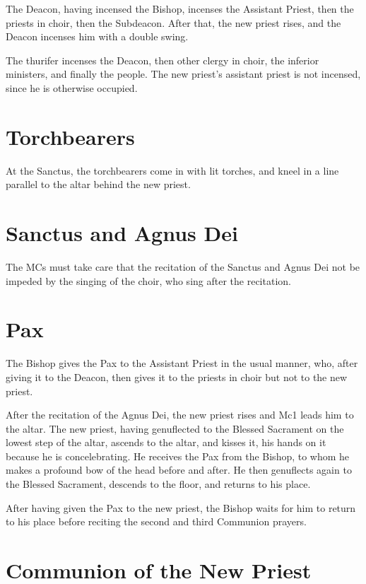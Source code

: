 \documentclass{report}
\begin{document}
{	The Deacon, having incensed the Bishop, incenses the Assistant Priest, then
	the priests in choir, then the Subdeacon. After that, the new priest rises,
	and the Deacon incenses him with a double swing.

	The thurifer incenses the Deacon, then other clergy in choir, the inferior
	ministers, and finally the people. The new priest’s assistant priest is not
	incensed, since he is otherwise occupied.

	\section{Torchbearers}

	At the Sanctus, the torchbearers come in with lit torches, and kneel in a
	line parallel to the altar behind the new priest.

	\section{Sanctus and Agnus Dei}

	The MCs must take care that the recitation of the Sanctus and Agnus Dei not
	be impeded by the singing of the choir, who sing after the recitation.

	\section{Pax}

	The Bishop gives the Pax to the Assistant Priest in the usual manner, who,
	after giving it to the Deacon, then gives it to the priests in choir but
	not to the new priest.

	After the recitation of the Agnus Dei, the new priest rises and Mc1 leads
	him to the altar. The new priest, having genuflected to the Blessed
	Sacrament on the lowest step of the altar, ascends to the altar, and kisses
	it, his hands on it because he is concelebrating. He receives the Pax from
	the Bishop, to whom he makes a profound bow of the head before and after.
	He then genuflects again to the Blessed Sacrament, descends to the floor,
	and returns to his place.

	After having given the Pax to the new priest, the Bishop waits for him to
	return to his place before reciting the second and third Communion prayers.

	\section{Communion of the New Priest}

}
\end{document}
